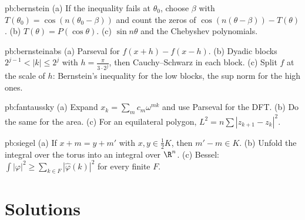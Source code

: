 \begin{hint}{pb:bernstein}
(a) If the inequality fails at $\theta_0$, choose $\beta$ with $T(\theta_0)=\cos(n(\theta_0-\beta))$ and count the zeros of $\cos(n(\theta-\beta))-T(\theta)$. (b) $T(\theta)=P(\cos\theta)$.
(c) $\sin n\theta$ and the Chebyshev polynomials.
\end{hint}

\begin{hint}{pb:bernsteinabs}
(a) Parseval for $f(x+h)-f(x-h)$. (b) Dyadic blocks $2^{j-1}<|k|\le2^j$ with $h=\frac\pi{3\cdot2^j}$, then Cauchy--Schwarz in each block. (c) Split
$f$ at the scale of $h$: Bernstein's inequality for the low blocks, the sup norm for the high ones.
\end{hint}

\begin{hint}{pb:fantaussky}
(a) Expand $x_k=\sum_mc_m\omega^{mk}$ and use Parseval for the DFT. (b) Do the same for the area. (c) For an equilateral polygon,
$L^2=n\sum|z_{k+1}-z_k|^2$.
\end{hint}

\begin{hint}{pb:siegel}
(a) If $x+m=y+m'$ with $x,y\in\frac12K$, then $m'-m\in K$. (b) Unfold the integral over the torus into an integral over $\R^n$. (c) Bessel:
$\int|\varphi|^2\ge\sum_{k\in F}|\hat\varphi(k)|^2$ for every finite $F$.
\end{hint}

\section{Solutions}

